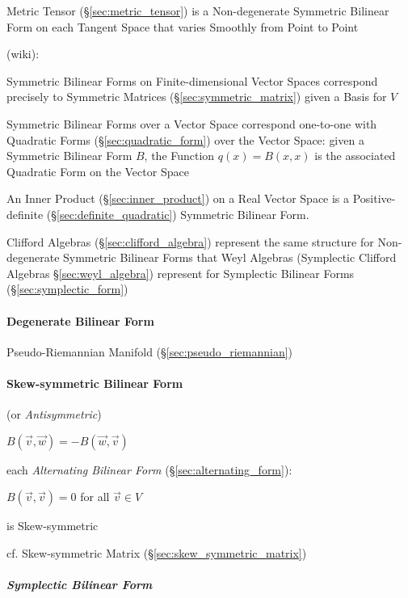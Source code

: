 Metric Tensor (\S\ref{sec:metric_tensor}) is a Non-degenerate Symmetric Bilinear
Form on each Tangent Space that varies Smoothly from Point to Point

(wiki):

Symmetric Bilinear Forms on Finite-dimensional Vector Spaces correspond
precisely to Symmetric Matrices (\S\ref{sec:symmetric_matrix}) given a Basis
for $V$

Symmetric Bilinear Forms over a Vector Space correspond one-to-one with
Quadratic Forms (\S\ref{sec:quadratic_form}) over the Vector Space: given a
Symmetric Bilinear Form $B$, the Function $q(x) = B(x,x)$ is the associated
Quadratic Form on the Vector Space

An Inner Product (\S\ref{sec:inner_product}) on a Real Vector Space is
a Positive-definite (\S\ref{sec:definite_quadratic}) Symmetric
Bilinear Form.

Clifford Algebras (\S\ref{sec:clifford_algebra}) represent the same structure
for Non-degenerate Symmetric Bilinear Forms that Weyl Algebras (Symplectic
Clifford Algebras \S\ref{sec:weyl_algebra}) represent for Symplectic Bilinear
Forms (\S\ref{sec:symplectic_form})



\paragraph{Degenerate Bilinear Form}
\label{sec:degenerate_bilinear_form}\hfill

Pseudo-Riemannian Manifold (\S\ref{sec:pseudo_riemannian})



\paragraph{Skew-symmetric Bilinear Form}
\label{sec:skew_symmetric_bilinear}\hfill

(or \emph{Antisymmetric})

$B(\vec{v},\vec{w}) = -B(\vec{w},\vec{v})$

each \emph{Alternating Bilinear Form} (\S\ref{sec:alternating_form}):

$B(\vec{v},\vec{v}) = 0$ for all $\vec{v} \in V$

is Skew-symmetric

\fist cf. Skew-symmetric Matrix (\S\ref{sec:skew_symmetric_matrix})



\subparagraph{Symplectic Bilinear Form}\label{sec:symplectic_bilinear}\hfill

